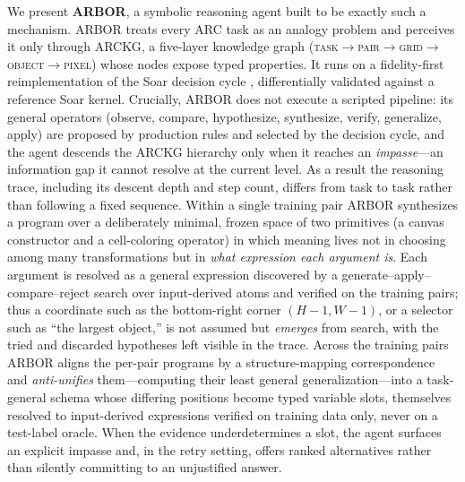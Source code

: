\documentclass[letterpaper]{article} %
\begin{document}
We present \textbf{ARBOR}, a symbolic reasoning agent built to be exactly such a
mechanism. ARBOR treats every ARC task as an analogy problem and perceives it
only through ARCKG, a five-layer knowledge graph
(\textsc{task}$\rightarrow$\textsc{pair}$\rightarrow$\textsc{grid}$\rightarrow$%
\textsc{object}$\rightarrow$\textsc{pixel}) whose nodes expose typed properties.
It runs on a fidelity-first reimplementation of the Soar decision cycle
\cite{newell1990unified,laird2012soar}, differentially validated against a
reference Soar kernel. Crucially, ARBOR does not execute a scripted pipeline:
its general operators (observe, compare, hypothesize, synthesize, verify,
generalize, apply) are proposed by production rules and selected by the decision
cycle, and the agent descends the ARCKG hierarchy only when it reaches an
\emph{impasse}---an information gap it cannot resolve at the current level. As a
result the reasoning trace, including its descent depth and step count, differs
from task to task rather than following a fixed sequence. Within a single
training pair ARBOR synthesizes a program over a deliberately minimal, frozen
space of two primitives (a canvas constructor and a cell-coloring operator) in
which meaning lives not in choosing among many transformations but in
\emph{what expression each argument is}. Each argument is resolved as a general
expression discovered by a generate--apply--compare--reject search over
input-derived atoms and verified on the training pairs; thus a coordinate such
as the bottom-right corner $(H-1,W-1)$, or a selector such as ``the largest
object,'' is not assumed but \emph{emerges} from search, with the tried and
discarded hypotheses left visible in the trace. Across the training pairs ARBOR
aligns the per-pair programs by a structure-mapping correspondence and
\emph{anti-unifies} them---computing their least general generalization---into a
task-general schema whose differing positions become typed variable slots,
themselves resolved to input-derived expressions verified on training data only,
never on a test-label oracle. When the evidence underdetermines a slot, the
agent surfaces an explicit impasse and, in the retry setting, offers ranked
alternatives rather than silently committing to an unjustified answer.
\end{document}

